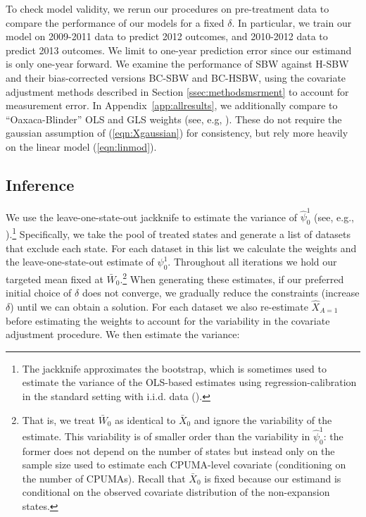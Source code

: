 \documentclass[aoas]{imsart}
\theoremstyle{plain}
\theoremstyle{remark}
\begin{document}
To check model validity, we rerun our procedures on pre-treatment data to compare the performance of our models for a fixed $\delta$. In particular, we train our model on 2009-2011 data to predict 2012 outcomes, and 2010-2012 data to predict 2013 outcomes. We limit to one-year prediction error since our estimand is only one-year forward. We examine the performance of SBW against H-SBW and their bias-corrected versions BC-SBW and BC-HSBW, using the covariate adjustment methods described in Section \ref{ssec:methodsmsrment} to account for measurement error. In Appendix~\ref{app:allresults}, we additionally compare to ``Oaxaca-Blinder'' OLS and GLS weights (see, e.g, \cite{kline2011oaxaca}). These do not require the gaussian assumption of (\ref{eqn:Xgaussian}) for consistency, but rely more heavily on the linear model (\ref{eqn:linmod}).

\subsection{Inference}

We use the leave-one-state-out jackknife to estimate the variance of $\hat{\psi}_0^1$ (see, e.g., \cite{cameron2015practitioner}).\footnote{The jackknife approximates the bootstrap, which is sometimes used to estimate the variance of the OLS-based estimates using regression-calibration in the standard setting with i.i.d. data (\cite{carroll2006measurement}).} Specifically, we take the pool of treated states and generate a list of datasets that exclude each state. For each dataset in this list we calculate the weights and the leave-one-state-out estimate of $\psi_0^1$. Throughout all iterations we hold our targeted mean fixed at $\bar{W}_0$.\footnote{That is, we treat $\bar{W}_0$ as identical to $\bar{X}_0$ and ignore the variability of the estimate. This variability is of smaller order than the variability in $\hat{\psi}_0^1$: the former does not depend on the number of states but instead only on the sample size used to estimate each CPUMA-level covariate (conditioning on the number of CPUMAs). Recall that $\bar{X}_0$ is fixed because our estimand is conditional on the observed covariate distribution of the non-expansion states.} When generating these estimates, if our preferred initial choice of $\delta$ does not converge, we gradually reduce the constraints (increase $\delta$) until we can obtain a solution. For each dataset we also re-estimate $\hat{X}_{A=1}$ before estimating the weights to account for the variability in the covariate adjustment procedure. We then estimate the variance:
\end{document}
